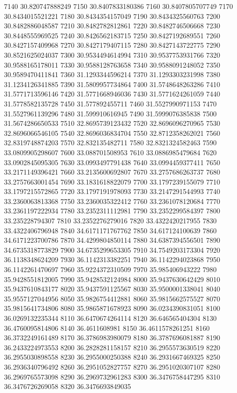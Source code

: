 {7140 30.820747888249
7150 30.8407833180386
7160 30.8407805707749
7170 30.8434015521221
7180 30.8434354157049
7190 30.8434325560763
7200 30.8482886048587
7210 30.8482782812861
7220 30.8482746506668
7230 30.8448555969525
7240 30.8426562183715
7250 30.8427192689551
7260 30.8427157409968
7270 30.8427179407115
7280 30.8427143722775
7290 30.8521625024037
7300 30.9534494614994
7310 30.9537753931766
7320 30.9588165178011
7330 30.9588128763658
7340 30.9588091248052
7350 30.9589470411841
7360 31.1293344596214
7370 31.1293303231998
7380 31.1234126341885
7390 31.5809957734864
7400 31.5748648263286
7410 31.5771713596146
7420 31.5771668946036
7430 31.5771624261059
7440 31.5778582135728
7450 31.577892455711
7460 31.5527990971153
7470 31.5527961139296
7480 31.599910616945
7490 31.5999076385838
7500 31.5674286650533
7510 32.8695739123432
7520 32.8696096270965
7530 32.8696066546105
7540 32.8696036834704
7550 32.8712358262021
7560 32.8319748874203
7570 32.832135482711
7580 32.8321324582463
7590 33.0809905298607
7600 33.088701508953
7610 33.0886985479684
7620 33.0902845095305
7630 33.0993497791438
7640 33.0994459377411
7650 33.2171149396421
7660 33.2135600692807
7670 33.2757686263737
7680 33.2757663001454
7690 33.1831618822079
7700 33.1797239155079
7710 33.1797215572865
7720 33.1797191978093
7730 33.2147291544993
7740 33.2360063813368
7750 33.2360035322412
7760 33.2361078120684
7770 33.2361197222934
7780 33.2352311112981
7790 33.2352299584397
7800 33.235228794307
7810 33.2352276279016
7820 33.4322420217955
7830 33.4322406796948
7840 34.6171171767762
7850 34.617124100639
7860 34.6171223700786
7870 34.4299804850114
7880 34.6387394556501
7890 34.6735318773829
7900 34.6735299653305
7910 34.7549203173304
7920 36.1138348624209
7930 36.1142313382251
7940 36.1142294023868
7950 36.1142261470697
7960 35.9224372310509
7970 35.985406943222
7980 35.9428551812005
7990 35.9428532124984
8000 35.9437630642429
8010 35.9437610843177
8020 35.9437591125567
8030 35.9500001338041
8040 35.9557127044956
8050 35.9826754412881
8060 35.9815662575527
8070 35.9815641734806
8080 35.9865871678923
8090 36.0234390831051
8100 36.0269132235344
8110 36.6470674264114
8120 36.646565404304
8130 36.4760095814806
8140 36.4611608981
8150 36.4611578261251
8160 36.3732249161489
8170 36.3786983980079
8180 36.3787696081887
8190 36.2433224973553
8200 36.2828281158157
8210 36.2955573630519
8220 36.2955030898558
8230 36.2955000250388
8240 36.2931667469325
8250 36.2936340796492
8260 36.2951052827757
8270 36.2951020307107
8280 36.2969765573098
8290 36.2969732961283
8300 36.3476758447295
8310 36.3476726269058
8320 36.3476693849035
}
